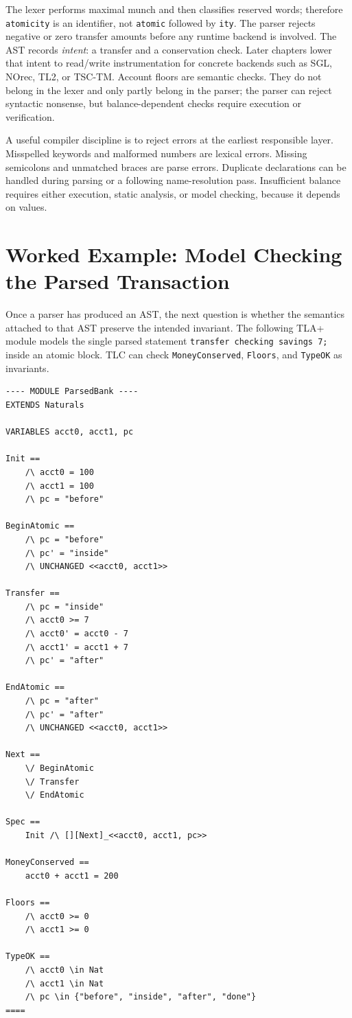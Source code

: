 The lexer performs maximal munch and then classifies reserved words; therefore \texttt{atomicity} is an identifier, not \texttt{atomic} followed by \texttt{ity}. The parser rejects negative or zero transfer amounts before any runtime backend is involved. The AST records \emph{intent}: a transfer and a conservation check. Later chapters lower that intent to read/write instrumentation for concrete backends such as SGL, NOrec, TL2, or TSC-TM. Account floors are semantic checks. They do not belong in the lexer and only partly belong in the parser; the parser can reject syntactic nonsense, but balance-dependent checks require execution or verification.

A useful compiler discipline is to reject errors at the earliest responsible layer. Misspelled keywords and malformed numbers are lexical errors. Missing semicolons and unmatched braces are parse errors. Duplicate declarations can be handled during parsing or a following name-resolution pass. Insufficient balance requires either execution, static analysis, or model checking, because it depends on values.

\section{Worked Example: Model Checking the Parsed Transaction}

Once a parser has produced an AST, the next question is whether the semantics
attached to that AST preserve the intended invariant. The following TLA+
module models the single parsed statement
\texttt{transfer checking savings 7;} inside an atomic block. TLC can check
\texttt{MoneyConserved}, \texttt{Floors}, and \texttt{TypeOK} as invariants.

\begin{lstlisting}[language={}, caption={A TLA+ model of the parsed bank transfer.}, label={lst:tla-parsed-bank}]
---- MODULE ParsedBank ----
EXTENDS Naturals

VARIABLES acct0, acct1, pc

Init ==
    /\ acct0 = 100
    /\ acct1 = 100
    /\ pc = "before"

BeginAtomic ==
    /\ pc = "before"
    /\ pc' = "inside"
    /\ UNCHANGED <<acct0, acct1>>

Transfer ==
    /\ pc = "inside"
    /\ acct0 >= 7
    /\ acct0' = acct0 - 7
    /\ acct1' = acct1 + 7
    /\ pc' = "after"

EndAtomic ==
    /\ pc = "after"
    /\ pc' = "after"
    /\ UNCHANGED <<acct0, acct1>>

Next ==
    \/ BeginAtomic
    \/ Transfer
    \/ EndAtomic

Spec ==
    Init /\ [][Next]_<<acct0, acct1, pc>>

MoneyConserved ==
    acct0 + acct1 = 200

Floors ==
    /\ acct0 >= 0
    /\ acct1 >= 0

TypeOK ==
    /\ acct0 \in Nat
    /\ acct1 \in Nat
    /\ pc \in {"before", "inside", "after", "done"}
====
\end{lstlisting}

